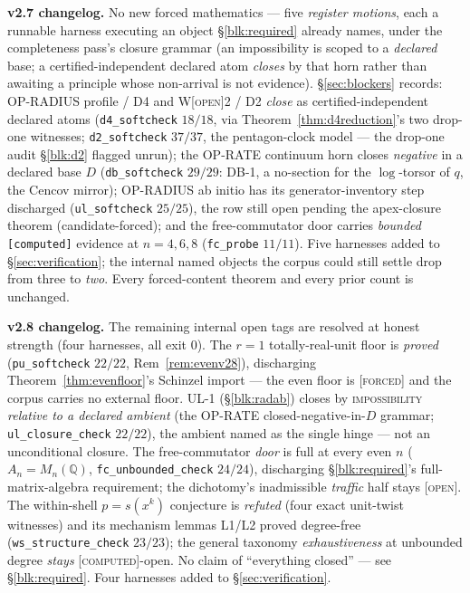 \documentclass[11pt]{article}
\newcommand{\tagF}{\textcolor{cF}{\textsc{[forced]}}}
\newcommand{\tagC}{\textcolor{cC}{\textsc{[computed]}}}
\newcommand{\tagO}{\textcolor{cO}{\textsc{[open]}}}
\newcommand{\Q}{\mathbb{Q}}
\theoremstyle{plain}
\theoremstyle{definition}
\theoremstyle{remark}
\begin{document}
\smallskip\noindent
\textbf{v2.7 changelog.} No new forced mathematics --- five \emph{register motions},
each a runnable harness executing an object \S\ref{blk:required} already names,
under the completeness pass's closure grammar (an impossibility is scoped to a
\emph{declared} base; a certified-independent declared atom \emph{closes} by that
horn rather than awaiting a principle whose non-arrival is not evidence).
\S\ref{sec:blockers} records: OP-RADIUS profile / D4 and W\tagO{}2 / D2 \emph{close}
as certified-independent declared atoms (\texttt{d4\_softcheck} $18/18$, via
Theorem~\ref{thm:d4reduction}'s two drop-one witnesses; \texttt{d2\_softcheck}
$37/37$, the pentagon-clock model --- the drop-one audit \S\ref{blk:d2} flagged
unrun); the OP-RATE continuum horn closes \emph{negative} in a declared base $D$
(\texttt{db\_softcheck} $29/29$: \textsc{DB-1}, a no-section for the $\log$-torsor
of $q$, the Cencov mirror); OP-RADIUS ab initio has its generator-inventory
step discharged (\texttt{ul\_softcheck} $25/25$), the row still open pending the
apex-closure theorem (candidate-forced); and the free-commutator door carries
\emph{bounded} \texttt{[computed]} evidence at $n=4,6,8$ (\texttt{fc\_probe}
$11/11$). Five harnesses added to \S\ref{sec:verification}; the internal named
objects the corpus could still settle drop from three to \emph{two}. Every
forced-content theorem and every prior count is unchanged.

\smallskip\noindent
\textbf{v2.8 changelog.} The remaining internal open tags are resolved at honest
strength (four harnesses, all exit 0). The $r=1$ totally-real-unit floor is
\emph{proved} (\texttt{pu\_softcheck} $22/22$, Rem~\ref{rem:evenv28}), discharging
Theorem~\ref{thm:evenfloor}'s Schinzel import --- the even floor is \tagF{} and the
corpus carries no external floor. UL-1 (\S\ref{blk:radab}) closes by
\textsc{impossibility} \emph{relative to a declared ambient} (the OP-RATE
closed-negative-in-$D$ grammar; \texttt{ul\_closure\_check} $22/22$), the ambient
named as the single hinge --- not an unconditional closure. The free-commutator
\emph{door} is full at every even $n$ ($A_n=M_n(\Q)$, \texttt{fc\_unbounded\_check}
$24/24$), discharging \S\ref{blk:required}'s full-matrix-algebra requirement; the
dichotomy's inadmissible \emph{traffic} half stays \tagO{}. The within-shell
$p=s(x^k)$ conjecture is \emph{refuted} (four exact unit-twist witnesses) and its
mechanism lemmas L1/L2 proved degree-free (\texttt{ws\_structure\_check} $23/23$);
the general taxonomy \emph{exhaustiveness} at unbounded degree \emph{stays}
\tagC{}-open. No claim of ``everything closed'' --- see \S\ref{blk:required}. Four
harnesses added to \S\ref{sec:verification}.
\end{document}
